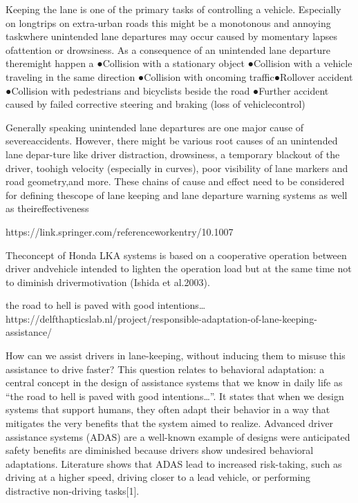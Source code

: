 Keeping the lane is one of the primary tasks of controlling a vehicle. Especially on longtrips  on  extra-urban  roads  this  might  be  a  monotonous  and  annoying  taskwhere unintended lane departures may occur caused  by momentary lapses  ofattention or drowsiness. As a consequence of an unintended lane departure theremight happen a
●Collision with a stationary object
●Collision with a vehicle traveling in the same direction
●Collision with oncoming traffic●Rollover accident
●Collision with pedestrians and bicyclists beside the road
●Further accident caused by failed corrective steering and braking (loss of vehiclecontrol)

Generally speaking unintended lane departures are one major cause of severeaccidents. However, there might be various root causes of an unintended lane depar-ture like driver distraction, drowsiness, a temporary blackout of the driver, toohigh velocity (especially in curves), poor visibility of lane markers and road geometry,and more. These chains of cause and effect need to be considered for defining thescope  of  lane  keeping  and  lane  departure  warning  systems  as  well  as  theireffectiveness

https://link.springer.com/referenceworkentry/10.1007%

Theconcept of Honda LKA systems is based on a cooperative operation between driver andvehicle intended to lighten the operation load but at the same time not to diminish drivermotivation (Ishida et al.2003).


the road to hell is paved with good intentions…
https://delfthapticslab.nl/project/responsible-adaptation-of-lane-keeping-assistance/

How can we assist drivers in lane-keeping, without inducing them to misuse this assistance to drive faster? This question relates to behavioral adaptation: a central concept in the design of assistance systems that we know in daily life as “the road to hell is paved with good intentions…”. It states that when we design systems that support humans, they often adapt their behavior in a way that mitigates the very benefits that the system aimed to realize. Advanced driver assistance systems (ADAS) are a well-known example of designs were anticipated safety benefits are diminished because drivers show undesired behavioral adaptations. Literature shows that ADAS lead to increased risk-taking, such as driving at a higher speed, driving closer to a lead vehicle, or performing distractive non-driving tasks[1].

